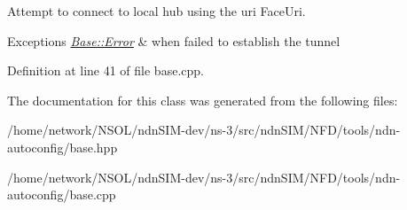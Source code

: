 Attempt to connect to local hub using the {\ttfamily uri} Face\+Uri. 


\begin{DoxyExceptions}{Exceptions}
{\em \hyperlink{classndn_1_1tools_1_1autoconfig_1_1Base_1_1Error}{Base\+::\+Error}} & when failed to establish the tunnel \\
\hline
\end{DoxyExceptions}


Definition at line 41 of file base.\+cpp.



The documentation for this class was generated from the following files\+:\begin{DoxyCompactItemize}
\item 
/home/network/\+N\+S\+O\+L/ndn\+S\+I\+M-\/dev/ns-\/3/src/ndn\+S\+I\+M/\+N\+F\+D/tools/ndn-\/autoconfig/base.\+hpp\item 
/home/network/\+N\+S\+O\+L/ndn\+S\+I\+M-\/dev/ns-\/3/src/ndn\+S\+I\+M/\+N\+F\+D/tools/ndn-\/autoconfig/base.\+cpp\end{DoxyCompactItemize}
